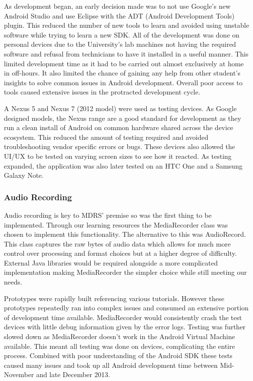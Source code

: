 \documentclass{l3proj}
\begin{document}
As development began, an early decision made was to not use Google's new Android Studio and use Eclipse with the ADT (Android Development Tools) plugin. This reduced the number of new tools to learn and avoided using unstable software while trying to learn a new SDK. All of the development was done on personal devices due to the University's lab machines not having the required software and refusal from technicians to have it installed in a useful manner. This limited development time as it had to be carried out almost exclusively at home in off-hours. It also limited the chance of gaining any help from other student's insights to solve common issues in Android development. Overall poor access to tools caused extensive issues in the protracted  development cycle.

A Nexus 5 and Nexus 7 (2012 model) were used as testing devices. As Google designed models, the Nexus range are a good standard for development as they run a clean install of Android on common hardware shared across the device ecosystem. This reduced the amount of testing required and avoided troubleshooting vendor specific errors or bugs. These devices also allowed the UI/UX to be tested on varying screen sizes to see how it reacted. As testing expanded, the application was also later tested on an HTC One and a Samsung Galaxy Note.

\subsubsection{Audio Recording}    Audio recording is key to MDRS' premise so was the first thing to be implemented. Through our learning resources the MediaRecorder class was chosen to implement this functionality. The alternative to this was AudioRecord. This class captures the raw bytes of audio data which allows for much more control over processing and format choices but at a higher degree of difficulty. External Java libraries would be required alongside a more complicated implementation making MediaRecorder the simpler choice while still meeting our needs.

Prototypes were rapidly built referencing various tutorials. However these prototypes repeatedly ran into complex issues and consumed an extensive portion of development time available. MediaRecorder would consistently crash the test devices with little debug information given by the error logs. Testing was further slowed down as MediaRecorder doesn't work in the Android Virtual Machine available. This meant all testing was done on devices, complicating the entire process. Combined with poor understanding of the Android SDK these tests caused many issues and took up all Android development time between Mid-November and late December 2013.
\end{document}
